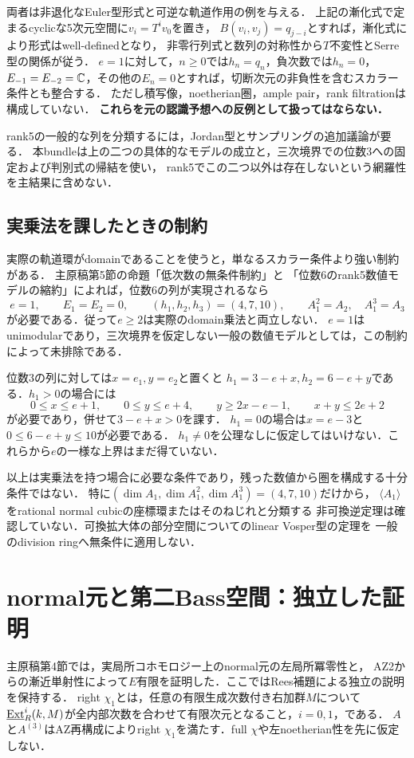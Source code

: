 \documentclass[11pt,a4paper]{ltjsarticle}
\begin{document}
両者は非退化なEuler型形式と可逆な軌道作用の例を与える．
上記の漸化式で定まるcyclicな5次元空間に$v_i=T^iv_0$を置き，
$B(v_i,v_j)=q_{j-i}$とすれば，漸化式により形式はwell-definedとなり，
非零行列式と数列の対称性から$T$不変性とSerre型の関係が従う．
$e=1$に対して，$n\geq0$では$h_n=q_n$，負次数では$h_n=0$，
$E_{-1}=E_{-2}=\mathbb C$，その他の$E_n=0$とすれば，切断次元の非負性を含むスカラー条件とも整合する．
ただし積写像，noetherian圏，ample pair，rank filtrationは構成していない．
\textbf{これらを元の認識予想への反例として扱ってはならない．}

rank5の一般的な列を分類するには，Jordan型とサンプリングの追加議論が要る．
本bundleは上の二つの具体的なモデルの成立と，三次境界での位数3への固定および判別式の帰結を使い，
rank5でこの二つ以外は存在しないという網羅性を主結果に含めない．

\subsection{実乗法を課したときの制約}
実際の軌道環がdomainであることを使うと，単なるスカラー条件より強い制約がある．
主原稿第5節の命題「低次数の無条件制約」と
「位数6のrank5数値モデルの縮約」によれば，位数6の列が実現されるなら
\[
 e=1,\qquad E_1=E_2=0,\qquad(h_1,h_2,h_3)=(4,7,10),
 \qquad A_1^2=A_2,\quad A_1^3=A_3
\]
が必要である．従って$e\geq2$は実際のdomain乗法と両立しない．
$e=1$はunimodularであり，三次境界を仮定しない一般の数値モデルとしては，この制約によって未排除である．

位数3の列に対しては$x=e_1,y=e_2$と置くと
$h_1=3-e+x,h_2=6-e+y$である．$h_1>0$の場合には
\[
 0\leq x\leq e+1,\qquad0\leq y\leq e+4,\qquad
 y\geq2x-e-1,\qquad x+y\leq2e+2
\]
が必要であり，併せて$3-e+x>0$を課す．
$h_1=0$の場合は$x=e-3$と$0\leq6-e+y\leq10$が必要である．
$h_1\ne0$を公理なしに仮定してはいけない．これらから$e$の一様な上界はまだ得ていない．

以上は実乗法を持つ場合に必要な条件であり，残った数値から圏を構成する十分条件ではない．
特に$(\dim A_1,\dim A_1^2,\dim A_1^3)=(4,7,10)$だけから，
$\langle A_1\rangle$をrational normal cubicの座標環またはそのねじれと分類する
非可換逆定理は確認していない．可換拡大体の部分空間についてのlinear Vosper型の定理を
一般のdivision ringへ無条件に適用しない．

\section{normal元と第二Bass空間：独立した証明}\label{sec:normal-bass}
主原稿第4節では，実局所コホモロジー上のnormal元の左局所冪零性と，
AZ2からの漸近単射性によって$E$有限を証明した．ここではRees補題による独立の説明を保持する．
right $\chi_1$とは，任意の有限生成次数付き右加群$M$について
$\underline{\operatorname{Ext}}^i_R(k,M)$が全内部次数を合わせて有限次元となること，$i=0,1$，である．
$A$と$A^{(3)}$はAZ再構成によりright $\chi_1$を満たす．full $\chi$や左noetherian性を先に仮定しない．
\end{document}
